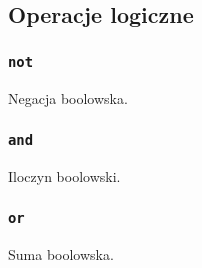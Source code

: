 \subsection{Operacje logiczne}
\label{viua_vm_ops_boolean_logic}

\subsubsection{\texttt{not}}

Negacja boolowska.

\subsubsection{\texttt{and}}

Iloczyn boolowski.

\subsubsection{\texttt{or}}

Suma boolowska.

